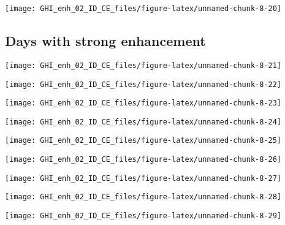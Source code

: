 \documentclass[
  10pt,
  a4paper,oneside]{article}
\begin{document}
\begin{center}\texttt{[image: GHI\_enh\_02\_ID\_CE\_files/figure-latex/unnamed-chunk-8-20]} \end{center}

\FloatBarrier

\hypertarget{days-with-strong-enhancement}{%
\subsection{Days with strong enhancement}\label{days-with-strong-enhancement}}

\begin{center}\texttt{[image: GHI\_enh\_02\_ID\_CE\_files/figure-latex/unnamed-chunk-8-21]} \end{center}

\begin{center}\texttt{[image: GHI\_enh\_02\_ID\_CE\_files/figure-latex/unnamed-chunk-8-22]} \end{center}

\begin{center}\texttt{[image: GHI\_enh\_02\_ID\_CE\_files/figure-latex/unnamed-chunk-8-23]} \end{center}

\begin{center}\texttt{[image: GHI\_enh\_02\_ID\_CE\_files/figure-latex/unnamed-chunk-8-24]} \end{center}

\begin{center}\texttt{[image: GHI\_enh\_02\_ID\_CE\_files/figure-latex/unnamed-chunk-8-25]} \end{center}

\begin{center}\texttt{[image: GHI\_enh\_02\_ID\_CE\_files/figure-latex/unnamed-chunk-8-26]} \end{center}

\begin{center}\texttt{[image: GHI\_enh\_02\_ID\_CE\_files/figure-latex/unnamed-chunk-8-27]} \end{center}

\begin{center}\texttt{[image: GHI\_enh\_02\_ID\_CE\_files/figure-latex/unnamed-chunk-8-28]} \end{center}

\begin{center}\texttt{[image: GHI\_enh\_02\_ID\_CE\_files/figure-latex/unnamed-chunk-8-29]} \end{center}
\end{document}

